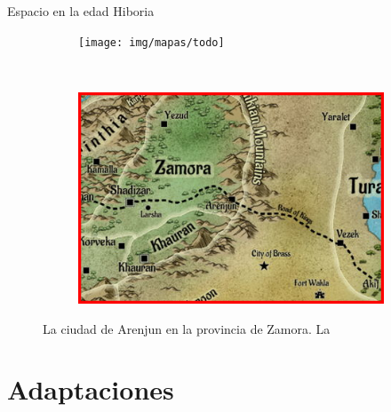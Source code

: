 \begin{frame}{Espacio en la edad Hiboria}
\begin{figure}[htp]
 \centering
 \begin{subfigure}[b]{0.48\textwidth}
   \texttt{[image: img/mapas/todo]}
 \end{subfigure}
~
 \begin{subfigure}[b]{0.48\textwidth}
   \includegraphics[width=\textwidth]{img/mapas/inset}
 \end{subfigure}
 \caption{La ciudad de Arenjun en la provincia de Zamora. La }
 \end{figure}
\end{frame}
\note{

}

\section{Adaptaciones}

